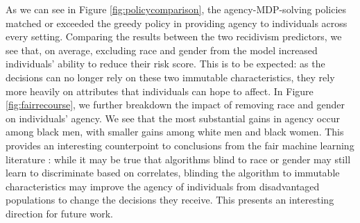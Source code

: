 As we can see in Figure \ref{fig:policycomparison}, the agency-MDP-solving policies matched or exceeded the greedy policy in providing agency to individuals across every setting.  Comparing the results between the two recidivism predictors, we see that, on average, excluding race and gender from the model increased individuals' ability to reduce their risk score. This is to be expected: as the decisions can no longer rely on these two immutable characteristics, they rely more heavily on attributes that individuals can hope to affect. 
In Figure \ref{fig:fairrecourse}, we further breakdown the impact of removing race and gender on individuals' agency. We see that the most substantial gains in agency occur among black men, with smaller gains among white men and black women. This provides an interesting counterpoint to conclusions from the fair machine learning literature \cite{dwork2012fairness}: while it may be true that algorithms blind to race or gender may still learn to discriminate based on correlates, blinding the algorithm to immutable characteristics may improve the agency of individuals from disadvantaged populations to change the decisions they receive. This presents an interesting direction for future work.

